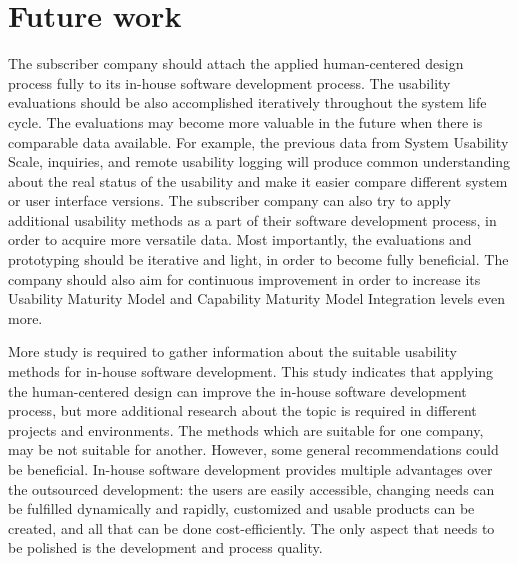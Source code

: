 \documentclass[12pt,a4paper,oneside,pdftex]{report}
\begin{document}
\section{Future work}
\label{sec:future}
The subscriber company should attach the applied human-centered design process fully to its in-house software development process. The usability evaluations should be also accomplished iteratively throughout the system life cycle. 
The evaluations may become more valuable in the future when there is comparable data available. For example, the previous data from System Usability Scale, inquiries, and remote usability logging will produce common understanding about the real status of the usability and make it easier compare different system or user interface versions. The subscriber company can also try to apply additional usability methods as a part of their software development process, in order to acquire more versatile data. Most importantly, the evaluations and prototyping should be iterative and light, in order to become fully beneficial. The company should also aim for continuous improvement in order to increase its Usability Maturity Model and Capability Maturity Model Integration levels even more. 
	
More study is required to gather information about the suitable usability methods for in-house software development. This study indicates that applying the human-centered design can improve the in-house software development process, but more additional research about the topic is required in different projects and environments. The methods which are suitable for one company, may be not suitable for another. However, some general recommendations could be beneficial. In-house software development provides multiple advantages over the outsourced development: the users are easily accessible, changing needs can be fulfilled dynamically and rapidly, customized and usable products can be created, and all that can be done cost-efficiently. The only aspect that needs to be polished is the development and process quality.

%	
	
\end{document}
